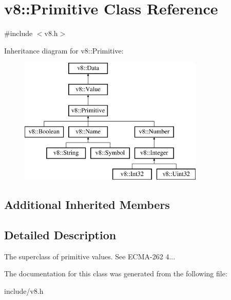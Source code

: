 \hypertarget{classv8_1_1_primitive}{}\section{v8\+:\+:Primitive Class Reference}
\label{classv8_1_1_primitive}


{\ttfamily \#include $<$v8.\+h$>$}

Inheritance diagram for v8\+:\+:Primitive\+:\begin{figure}[H]
\begin{center}
\leavevmode
\includegraphics[height=6.000000cm]{classv8_1_1_primitive}
\end{center}
\end{figure}
\subsection*{Additional Inherited Members}


\subsection{Detailed Description}
The superclass of primitive values. See E\+C\+M\+A-\/262 4... 

The documentation for this class was generated from the following file\+:\begin{DoxyCompactItemize}
\item 
include/v8.\+h\end{DoxyCompactItemize}

